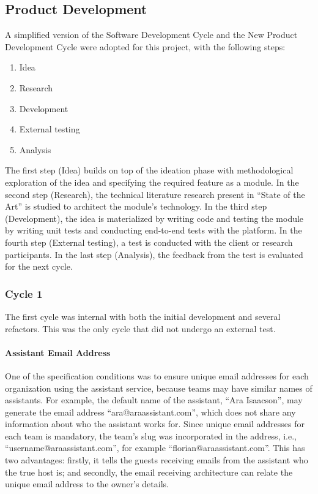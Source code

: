 \documentclass{article}
\begin{document}
\subsection{Product Development}

A simplified version of the Software Development Cycle and the New Product Development Cycle were adopted for this project, with the following steps:

\begin{enumerate}
	\item Idea
	\item Research
	\item Development
	\item External testing
	\item Analysis
\end{enumerate}

The first step (Idea) builds on top of the ideation phase with methodological exploration of the idea and specifying the required feature as a module. In the second step (Research), the technical literature research present in “State of the Art” is studied to architect the module’s technology. In the third step (Development), the idea is materialized by writing code and testing the module by writing unit tests and conducting end-to-end tests with the platform. In the fourth step (External testing), a test is conducted with the client or research participants. In the last step (Analysis), the feedback from the test is evaluated for the next cycle.

\subsubsection{Cycle 1}

The first cycle was internal with both the initial development and several refactors. This was the only cycle that did not undergo an external test.

\paragraph{Assistant Email Address}

One of the specification conditions was to ensure unique email addresses for each organization using the assistant service, because teams may have similar names of assistants. For example, the default name of the assistant, “Ara Isaacson”, may generate the email address “ara@araassistant.com”, which does not share any information about who the assistant works for. Since unique email addresses for each team is mandatory, the team’s slug was incorporated in the address, i.e., “username@araassistant.com”, for example “florian@araassistant.com”. This has two advantages: firstly, it tells the guests receiving emails from the assistant who the true host is; and secondly, the email receiving architecture can relate the unique email address to the owner’s details.
\end{document}

